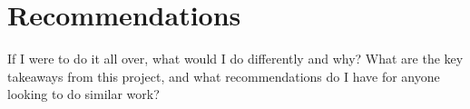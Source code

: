 \section{Recommendations}
\label{sectraining}
If I were to do it all over, what would I do differently and why? What are the key takeaways from this project, and what recommendations do I have for anyone looking to do similar work?
